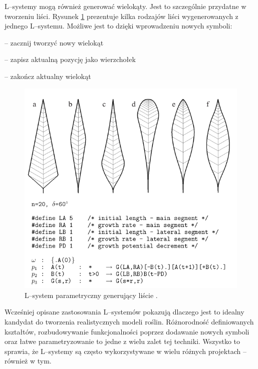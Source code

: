 \documentclass[inz,shortabstract]{iithesis}
\begin{document}
        L--systemy mogą również generować wielokąty. Jest to szczególnie przydatne w tworzeniu liści. Rysunek \ref{fig:lsystemLeafs} prezentuje kilka rodzajów liści wygenerowanych z jednego L--systemu. Możliwe jest to dzięki wprowadzeniu nowych symboli:
        \begin{description}[itemsep=2pt, parsep=2pt, topsep=2pt, partopsep=2pt]
            \item[\text{\{}] -- zacznij tworzyć nowy wielokąt 
            \item[.] -- zapisz aktualną pozycję jako wierzchołek
            \item[\text{\}}] -- zakończ aktualny wielokąt
        \end{description}
        \begin{figure}[H]
            \includegraphics[width=\linewidth]{lsystemLeafs.png}
            \caption{L--system parametryczny generujący liście \cite{plants}.} 
            \label{fig:lsystemLeafs}
        \end{figure}
        
        Wcześniej opisane zastosowania L--systemów pokazują dlaczego jest to idealny kandydat do tworzenia realistycznych modeli roślin. Różnorodność definiowanych kształtów, rozbudowywanie funkcjonalności poprzez dodawanie nowych symboli oraz łatwe parametryzowanie to jedne z wielu zalet tej techniki. Wszystko to sprawia, że L--systemy są często wykorzystywane w wielu różnych projektach -- również w tym. 
        
\end{document}
